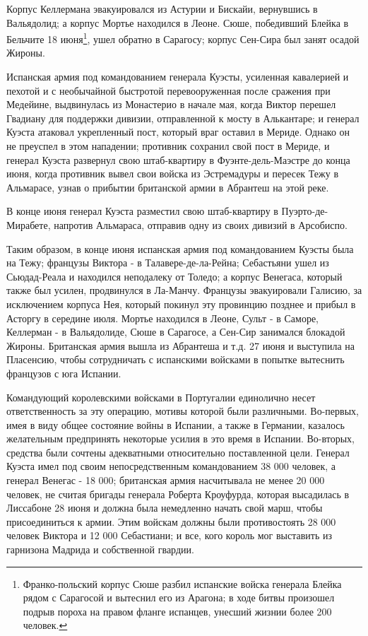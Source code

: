 \documentclass[
  oneside,
  12pt,
  titlepage]{book}
\begin{document}
Корпус Келлермана эвакуировался из Астурии и Бискайи, вернувшись в Вальядолид; а корпус Мортье находился в Леоне. Сюше, победивший Блейка в Бельчите 18 июня\footnote{Франко-польский корпус Сюше разбил испанские войска генерала Блейка рядом с Сарагосой и вытеснил его из Арагона; в ходе битвы произошел подрыв пороха на правом фланге испанцев, унесший жизнии более 200 человек.}, ушел обратно в Сарагосу; корпус Сен-Сира был занят осадой Жироны.

Испанская армия под командованием генерала Куэсты, усиленная кавалерией и пехотой и с необычайной быстротой перевооруженная после сражения при Медейине, выдвинулась из Монастерио в начале мая, когда Виктор перешел Гвадиану для поддержки дивизии, отправленной к мосту в Алькантаре; и генерал Куэста атаковал укрепленный пост, который враг оставил в Мериде. Однако он не преуспел в этом нападении; противник сохранил свой пост в Мериде, и генерал Куэста развернул свою штаб-квартиру в Фуэнте-дель-Маэстре до конца июня, когда противник вывел свои войска из Эстремадуры и пересек Тежу в Альмарасе, узнав о прибытии британской армии в Абрантеш на этой реке.

В конце июня генерал Куэста разместил свою штаб-квартиру в Пуэрто-де-Мирабете, напротив Альмараса, отправив одну из своих дивизий в Арсобиспо.

Таким образом, в конце июня испанская армия под командованием Куэсты была на Тежу; французы Виктора - в Талавере-де-ла-Рейна; Себастьяни ушел из Сьюдад-Реала и находился неподалеку от Толедо; а корпус Венегаса, который также был усилен, продвинулся в Ла-Манчу. Французы эвакуировали Галисию, за исключением корпуса Нея, который покинул эту провинцию позднее и прибыл в Асторгу в середине июля. Мортье находился в Леоне, Сульт - в Саморе, Келлерман - в Вальядолиде, Сюше в Сарагосе, а Сен-Сир занимался блокадой Жироны. Британская армия вышла из Абрантеша и т.д. 27 июня и выступила на Пласенсию, чтобы сотрудничать с испанскими войсками в попытке вытеснить французов с юга Испании.

Командующий королевскими войсками в Португалии единолично несет ответственность за эту операцию, мотивы которой были различными. Во-первых, имея в виду общее состояние войны в Испании, а также в Германии, казалось желательным предпринять некоторые усилия в это время в Испании. Во-вторых, средства были сочтены адекватными относительно поставленной цели. Генерал Куэста имел под своим непосредственным командованием 38 000 человек, а генерал Венегас - 18 000; британская армия насчитывала не менее 20 000 человек, не считая бригады генерала Роберта Кроуфурда, которая высадилась в Лиссабоне 28 июня и должна была немедленно начать свой марш, чтобы присоединиться к армии. Этим войскам должны были противостоять 28 000 человек Виктора и 12 000 Себастиани; и все, кого король мог выставить из гарнизона Мадрида и собственной гвардии.
\end{document}
